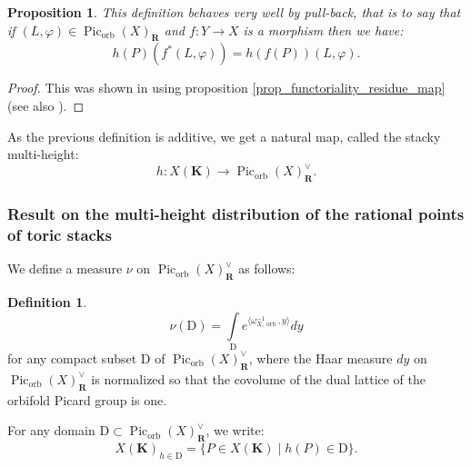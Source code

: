 \documentclass{proc-l}
\newcommand{\R}{\mathbf{R}}
\newcommand{\K}{\mathbf{K}}
\DeclareMathOperator{\Pic}{Pic}
\DeclareMathOperator{\stack}{stack}
\DeclareMathOperator{\orb}{orb}
\newcommand{\w}{\omega}
\newtheorem{prop}[theorem]{Proposition}
\theoremstyle{definition}
\newtheorem{definition}[theorem]{Definition}
\theoremstyle{remark}
\numberwithin{equation}{section}
\begin{document}
\begin{prop}\label{proposition_transivity_property_of_stacky_heights}
    This definition behaves very well by pull-back, that is to say that if $(L,\varphi) \in \Pic_{\orb}(X)_ {\R}$ and $f : Y \rightarrow X$ is a morphism then we have:
    $$h(P)(f^*(L,\varphi)) = h(f(P))(L,\varphi) .$$
\end{prop}

\begin{proof}
    This was shown in \cite[proposition 4.4]{darda2024batyrevmanin} using proposition \ref{prop_functoriality_residue_map} (see also \cite[proposition 2.20]{darda2024batyrevmanin}).
\end{proof}

As the previous definition is additive, we get a natural map, called the stacky multi-height:
$$ h : X(\K) \rightarrow \Pic_{\orb}(X)^{\vee}_{\R}  .$$




\subsubsection{Result on the multi-height distribution of the rational points of toric stacks}

We define a measure $\nu$ on $\Pic_{\orb}(X)^{\vee}_{\R}$ as follows:

\begin{definition}\label{mesure_picard_group}
    $$ \nu(\mathrm{D}) = \int\limits_{\mathrm{D}} e^{\langle \w_{X,\orb}^{-1},y \rangle} dy $$for any compact subset $\mathrm{D}$ of $\Pic_{\orb}(X)^{\vee}_{\R}$, where the Haar measure $dy$ on $\Pic_{\orb}(X)^{\vee}_{\R}$ is normalized so that the covolume of the dual lattice of the orbifold Picard group is one.
\end{definition}

For any domain $\mathrm{D} \subset \Pic_{\orb}(X)^{\vee}_{\R}$, we write:
$$ X(\K)_{h \in \mathrm{D}} = \{ P \in X(\K) \mid h(P) \in \mathrm{D} \} .$$
\end{document}
